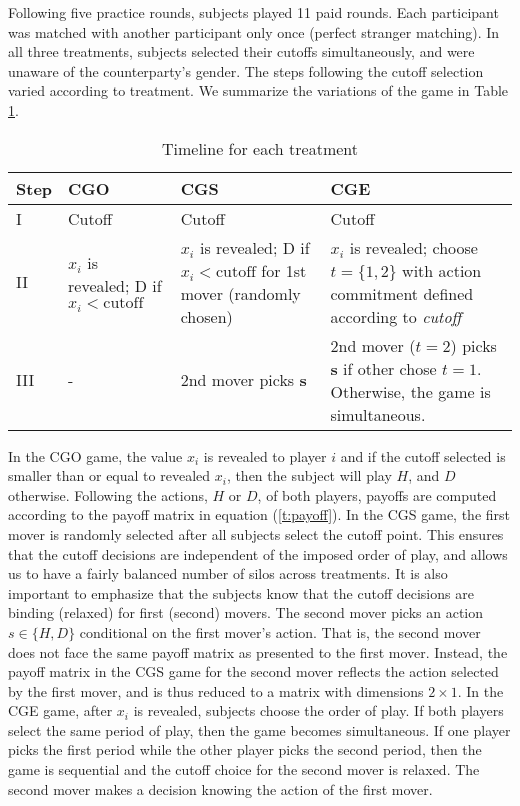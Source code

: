 \documentclass[12pt, letterpaper]{article}
\theoremstyle{plain}
\begin{document}
Following five practice rounds, subjects played 11 paid rounds. Each participant was matched with another participant only once (perfect stranger matching).  In all three treatments, subjects selected their cutoffs simultaneously, and were unaware of the counterparty's gender. The steps following the cutoff selection varied according to treatment. We summarize the variations of the game in Table \ref{table:time}. 

\begin{table}[ht]
\begin{center}

\caption{Timeline for each treatment}
\label{table:time}

\begin{tabular}{l|m{2.8cm}|m{3.5cm}|m{5cm}}
  Step & CGO & CGS & CGE\\
  \hline 
I & Cutoff & Cutoff & Cutoff \\
\hline
II& $x_i$ is revealed; D if $x_i< \text{cutoff}$ & $x_i$ is revealed; D if $x_i< \text{cutoff}$ for 1st mover (randomly chosen)
& $x_i$ is revealed; choose $t=\{1,2\}$ with action commitment defined according to \textit{cutoff}\\
\hline
III & - & 2nd mover picks \textbf{s} & 2nd mover ($t=2$) picks \textbf{s} if other chose $t=1$. Otherwise, the game is simultaneous.\\
\hline

\end{tabular}
\end{center}
\end{table}

In the CGO game, the value $x_i$ is revealed to player $i$ and if the cutoff selected is smaller than or equal to revealed $x_i$, then the subject will play $H$, and $D$ otherwise. Following the actions, $H$ or $D$, of both players, payoffs are computed according to the payoff matrix in equation (\ref{t:payoff}). In the CGS game, the first mover is randomly selected after all subjects select the cutoff point. This ensures that the cutoff decisions are independent of the imposed order of play, and allows us to have a fairly balanced number of silos across treatments. It is also important to emphasize that the subjects know that the cutoff decisions are binding (relaxed) for first (second) movers. The second mover picks an action $s\in\{H,D\}$ conditional on the first mover's action. That is, the second mover does not face the same payoff matrix as presented to the first mover. Instead, the payoff matrix in the CGS game for the second mover reflects the action selected by the first mover, and is thus reduced to a matrix with dimensions $2 \times 1$. In the CGE game, after $x_i$ is revealed, subjects choose the order of play. If both players select the same period of play, then the game becomes simultaneous. If one player picks the first period while the other player picks the second period, then the game is sequential and the cutoff choice for the second mover is relaxed. The second mover makes a decision knowing the action of the first mover. 
\end{document}
